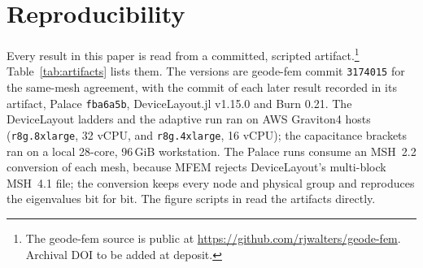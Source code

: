 \documentclass{anvil-paper}
\begin{document}
\section{Reproducibility}
\label{sec:repro}

Every result in this paper is read from a committed, scripted
artifact.\footnote{The geode-fem source is public at
\url{https://github.com/rjwalters/geode-fem}. Archival DOI to be added at
deposit.}
Table~\ref{tab:artifacts} lists them. The versions are geode-fem commit
\texttt{3174015} for the same-mesh agreement, with the commit of each later
result recorded in its artifact, Palace \texttt{fba6a5b}, DeviceLayout.jl
v1.15.0 and Burn 0.21. The DeviceLayout ladders and the adaptive run ran on
AWS Graviton4 hosts (\texttt{r8g.8xlarge}, 32 vCPU, and
\texttt{r8g.4xlarge}, 16 vCPU); the capacitance brackets ran on a local
28-core, 96\,GiB workstation. The Palace runs consume an MSH~2.2
conversion of each mesh, because MFEM rejects DeviceLayout's multi-block
MSH~4.1 file; the conversion keeps every node and physical group and
reproduces the eigenvalues bit for bit. The figure scripts in
 read the artifacts directly.
\end{document}

